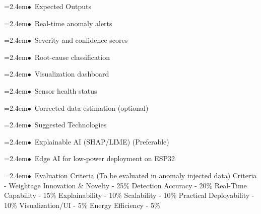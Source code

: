 \documentclass[10pt,a4paper]{article}
\begin{document}
\begin{tcolorbox}[pscard, title={"\textbf{SIH26073} \quad $\vert$ \quad AI/ML-Based Intelligent Anomaly Detection for Automatic Weather Stations (A...}]
\noindent\hspace*{1.2em}\hangindent=2.4em\textcolor{sihblue}{$\bullet$}~\small Expected Outputs\par\vspace{0.05cm}
\noindent\hspace*{1.2em}\hangindent=2.4em\textcolor{sihblue}{$\bullet$}~\small Real-time anomaly alerts\par\vspace{0.05cm}
\noindent\hspace*{1.2em}\hangindent=2.4em\textcolor{sihblue}{$\bullet$}~\small Severity and confidence scores\par\vspace{0.05cm}
\noindent\hspace*{1.2em}\hangindent=2.4em\textcolor{sihblue}{$\bullet$}~\small Root-cause classification\par\vspace{0.05cm}
\noindent\hspace*{1.2em}\hangindent=2.4em\textcolor{sihblue}{$\bullet$}~\small Visualization dashboard\par\vspace{0.05cm}
\noindent\hspace*{1.2em}\hangindent=2.4em\textcolor{sihblue}{$\bullet$}~\small Sensor health status\par\vspace{0.05cm}
\noindent\hspace*{1.2em}\hangindent=2.4em\textcolor{sihblue}{$\bullet$}~\small Corrected data estimation (optional)\par\vspace{0.05cm}
\noindent\hspace*{1.2em}\hangindent=2.4em\textcolor{sihblue}{$\bullet$}~\small Suggested Technologies\par\vspace{0.05cm}
\noindent\hspace*{1.2em}\hangindent=2.4em\textcolor{sihblue}{$\bullet$}~\small Explainable AI (SHAP/LIME) (Preferable)\par\vspace{0.05cm}
\noindent\hspace*{1.2em}\hangindent=2.4em\textcolor{sihblue}{$\bullet$}~\small Edge AI for low-power deployment on ESP32\par\vspace{0.05cm}
\noindent\hspace*{1.2em}\hangindent=2.4em\textcolor{sihblue}{$\bullet$}~\small Evaluation Criteria (To be evaluated in anomaly injected data) Criteria - Weightage Innovation \& Novelty - 25\% Detection Accuracy - 20\% Real-Time Capability - 15\% Explainability - 10\% Scalability - 10\% Practical Deployability - 10\% Visualization/UI - 5\% Energy Efficiency - 5\%\par\vspace{0.05cm}

\end{tcolorbox}
\end{document}
